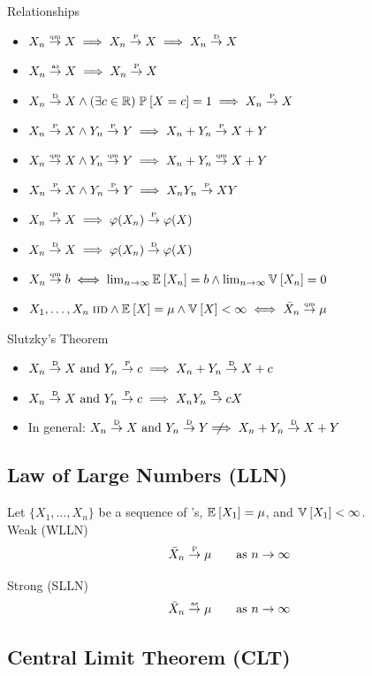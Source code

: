 \documentclass[landscape]{article}
\begin{document}
\begin{multicols*}{2}
Relationships
\begin{itemize}
  \item $X_n \qmconv X \imp X_n \pconv X \imp X_n \dconv X$
  \item $X_n \asconv X \imp X_n \pconv X$
  \item $X_n \dconv X \wedge (\exists c \in \R) \; \Pr{X=c} = 1
    \imp X_n \pconv X$
  \item $X_n \pconv X \wedge Y_n \pconv Y 
    \imp X_n + Y_n \pconv X + Y$
  \item $X_n \qmconv X \wedge Y_n \qmconv Y 
    \imp X_n + Y_n \qmconv X + Y$
  \item $X_n \pconv X \wedge Y_n \pconv Y 
    \imp X_nY_n \pconv XY$
  \item $X_n \pconv X \imp \transform(X_n) \pconv \transform(X)$
  \item $X_n \dconv X \imp \transform(X_n) \dconv \transform(X)$
  \item $X_n \qmconv b \eqv \lim_{n\to\infty} \E{X_n}=b 
    \wedge \lim_{n\to\infty} \V{X_n} = 0$
  \item $X_1,\dots,X_n\; \iid \wedge \E{X}=\mu \wedge \V{X}<\infty
    \eqv \samplemean \qmconv \mu$
\end{itemize}

Slutzky's Theorem
\begin{itemize}
  \item $X_n \dconv X \text{ and } Y_n \pconv c 
    \imp X_n + Y_n \dconv X + c$
  \item $X_n \dconv X \text{ and } Y_n \pconv c 
    \imp X_nY_n \dconv cX$
  \item In general: $X_n \dconv X \text{ and } Y_n \dconv Y
    \nimp X_n + Y_n \dconv X + Y$
\end{itemize}

\subsection{Law of Large Numbers (LLN)}

Let $\{X_1,\ldots,X_n\}$ be a sequence of \iid \rv's, $\E{X_1}=\mu$, and 
$\V{X_1} < \infty$.\\

Weak (WLLN)
$$\samplemean \pconv \mu \qquad\text{as } n\to\infty$$

Strong (SLLN)
$$\samplemean \asconv \mu \qquad\text{as } n\to\infty$$

\subsection{Central Limit Theorem (CLT)}


\end{multicols*}
\end{document}
